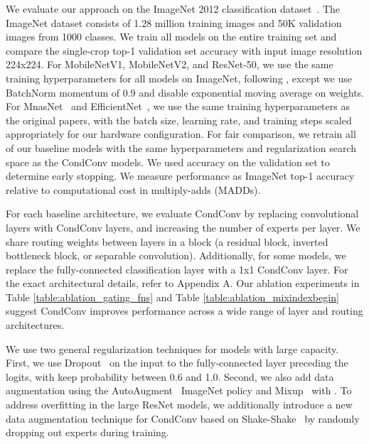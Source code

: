 \documentclass{article}
\def\codename{CondConv}
\begin{document}
We evaluate our approach on the ImageNet 2012 classification dataset~\cite{russakovsky2015imagenet}. The ImageNet dataset consists of 1.28 million training images and 50K validation images from 1000 classes. We train all models on the entire training set and compare the single-crop top-1 validation set accuracy with input image resolution 224x224. For MobileNetV1, MobileNetV2, and ResNet-50, we use the same training hyperparameters for all models on ImageNet, following \cite{kornblith2018better}, except we use BatchNorm momentum of 0.9 and disable exponential moving average on weights. For MnasNet~\cite{tan2018mnasnet} and EfficientNet~\cite{tan2019efficientnet}, we use the same training hyperparameters as the original papers, with the batch size, learning rate, and training steps scaled appropriately for our hardware configuration. For fair comparison, we retrain all of our baseline models with the same hyperparameters and regularization search space as the \codename{} models. We used accuracy on the validation set to determine early stopping. We measure performance as ImageNet top-1 accuracy relative to computational cost in multiply-adds (MADDs).

For each baseline architecture, we evaluate \codename{} by replacing convolutional layers with \codename{} layers, and increasing the number of experts per layer. We share routing weights between layers in a block (a residual block, inverted bottleneck block, or separable convolution). Additionally, for some models, we replace the fully-connected classification layer with a 1x1 \codename{} layer. For the exact architectural details, refer to Appendix A. Our ablation experiments in Table \ref{table:ablation_gating_fns} and Table \ref{table:ablation_mixindexbegin} suggest \codename{} improves performance across a wide range of layer and routing architectures.

We use two general regularization techniques for models with large capacity. First, we use Dropout~\cite{srivastava2014dropout} on the input to the fully-connected layer preceding the logits, with keep probability between 0.6 and 1.0. Second, we also add data augmentation using the AutoAugment~\cite{cubuk2018autoaugment} ImageNet policy and Mixup~\cite{zhang2017mixup} with . To address overfitting in the large ResNet models, we additionally introduce a new data augmentation technique for \codename{} based on Shake-Shake~\cite{gastaldi2017shake} by randomly dropping out experts during training. 
\end{document}
